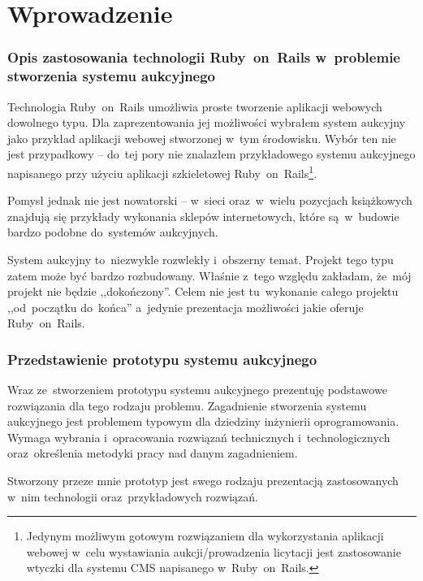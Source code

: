 \section{Wprowadzenie}

\subsubsection{Opis zastosowania technologii Ruby~on~Rails w~problemie stworzenia systemu aukcyjnego}

Technologia Ruby~on~Rails umożliwia proste tworzenie aplikacji webowych dowolnego typu. Dla zaprezentowania jej możliwości wybrałem system aukcyjny jako przykład aplikacji webowej stworzonej w~tym środowisku. Wybór ten nie jest przypadkowy -- do~tej pory nie znalazłem przykładowego systemu aukcyjnego napisanego przy użyciu aplikacji szkieletowej Ruby~on~Rails\footnote{Jedynym możliwym gotowym rozwiązaniem dla wykorzystania aplikacji webowej w~celu wystawiania aukcji/prowadzenia licytacji jest zastosowanie wtyczki %
dla systemu CMS %
napisanego w~Ruby~on~Rails.}.


Pomysł jednak nie jest nowatorski -- w~sieci oraz~w~wielu pozycjach książkowych znajdują się przykłady wykonania sklepów internetowych, które są~w~budowie bardzo podobne do~systemów aukcyjnych.


System aukcyjny to~niezwykle rozwlekły i~obszerny temat. Projekt tego typu zatem może być bardzo rozbudowany. Właśnie z~tego względu zakładam, że~mój projekt nie będzie ,,dokończony''. Celem nie jest tu~wykonanie całego projektu ,,od~początku do~końca'' a~jedynie prezentacja możliwości jakie oferuje Ruby~on~Rails.

\subsubsection{Przedstawienie prototypu systemu aukcyjnego}

Wraz ze~stworzeniem prototypu systemu aukcyjnego prezentuję podstawowe rozwią\-zania dla tego rodzaju problemu. Zagadnienie stworzenia systemu aukcyjnego jest problemem typowym dla dziedziny inżynierii oprogramowania. Wymaga wybrania i~opracowania rozwiązań technicznych i~technologicznych oraz~określenia metodyki pracy nad danym zagadnieniem.


Stworzony przeze mnie prototyp jest swego rodzaju prezentacją zastosowanych w~nim technologii oraz~przykładowych rozwiązań.
